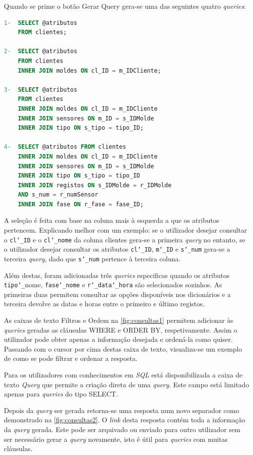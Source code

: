 \documentclass[11pt,twoside,a4paper]{report}
\begin{document}
Quando  se prime o botão Gerar Query gera-se uma das seguintes quatro \textit{queries}:
\begin{lstlisting}[language = SQL]
1-	SELECT @atributos
	FROM clientes;
	
2-	SELECT @atributos
	FROM clientes
	INNER JOIN moldes ON cl_ID = m_IDCliente;
	
3-	SELECT @atributos
	FROM clientes
	INNER JOIN moldes ON cl_ID = m_IDCliente
	INNER JOIN sensores ON m_ID = s_IDMolde
	INNER JOIN tipo ON s_tipo = tipo_ID;
	
4-	SELECT @atributos FROM clientes
	INNER JOIN moldes ON cl_ID = m_IDCliente
	INNER JOIN sensores ON m_ID = s_IDMolde 
	INNER JOIN tipo ON s_tipo = tipo_ID
	INNER JOIN registos ON s_IDMolde = r_IDMolde
	AND s_num = r_numSensor
	INNER JOIN fase ON r_fase = fase_ID;
\end{lstlisting}
A seleção é feita com base na coluna mais à esquerda a que os atributos pertencem. Explicando melhor com um exemplo: se o utilizador desejar consultar o \texttt{cl\char`_ID} e o \texttt{cl\char`_nome} da coluna clientes gera-se a primeira \textit{query} no entanto, se o utilizador desejar consultar os atributos \texttt{cl\char`_ID}, \texttt{m\char`_ID} e \texttt{s\char`_num} gera-se a terceira \textit{query}, dado que \texttt{s\char`_num} pertence à terceira coluna.\par
Além destas, foram adicionadas três \textit{queries} especificas quando os atributos \texttt{tipo\char`_}nome, \texttt{fase\char`_nome} e \texttt{r\char`_data}\texttt{\char`_hora} são selecionados sozinhos. As primeiras duas permitem consultar as opções disponíveis nos dicionários e a terceira devolve as datas e horas entre o primeiro e último registos.\par
As caixas de texto Filtros e Ordem na \autoref{fig:consultas1} permitem adicionar às \textit{queries} geradas as cláusulas WHERE e ORDER BY, respetivamente. Assim o utilizador pode obter apenas a informação desejada e ordená-la como quiser. Passando com o cursor por cima destas caixa de texto, visualiza-se um exemplo de como se pode filtrar e ordenar a resposta.\par 
Para os utilizadores com conhecimentos em \textit{SQL} está disponibilizada a caixa de texto \textit{Query} que permite a criação direta de uma \textit{query}. Este campo está limitado apenas para \textit{queries} do tipo SELECT.\par
Depois da \textit{query} ser gerada retorna-se uma resposta num novo separador como demonstrado na \autoref{fig:consultas2}. O \textit{link} desta resposta contém toda a informação da \textit{query} gerada. Este pode ser arquivado ou enviado para outro utilizador sem ser necessário gerar a \textit{query} novamente, isto é útil para \textit{queries} com muitas cláusulas.\par
\end{document}
